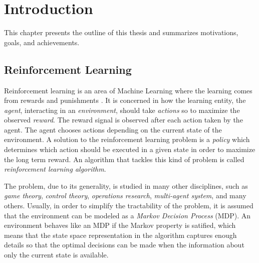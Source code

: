 \chapter{Introduction}
This chapter presents the outline of this thesis and summarizes motivations, goals, and achievements.

\section{Reinforcement Learning}
Reinforcement learning is an area of Machine Learning where the learning comes from rewards and punishments \citep{Sutton:1998:IRL:551283}. It is concerned in how the learning entity, the \emph{agent}, interacting in an \emph{environment}, should take \emph{actions} so to maximize the observed \emph{reward}. The reward signal is observed after each action taken by the agent. The agent chooses actions depending on the current state of the environment. A solution to the reinforcement learning problem is a \emph{policy} which determines which action should
be executed in a given state in order to maximize the long term reward. An algorithm that tackles this kind of problem is called \emph{reinforcement learning algorithm}.

\medskip
The problem, due to its generality, is studied in many other disciplines, such as \emph{game theory}, \emph{control theory}, \emph{operations research}, \emph{multi-agent system}, and many others. Usually, in order to simplify the tractability of the problem, it is assumed that the environment can be modeled as a \emph{Markov Decision Process} (MDP). An environment behaves like an MDP if the Markov property is satified, which means that the state space representation in the algorithm captures enough details so that the optimal decisions can be made when the information about only the current state is available. 

